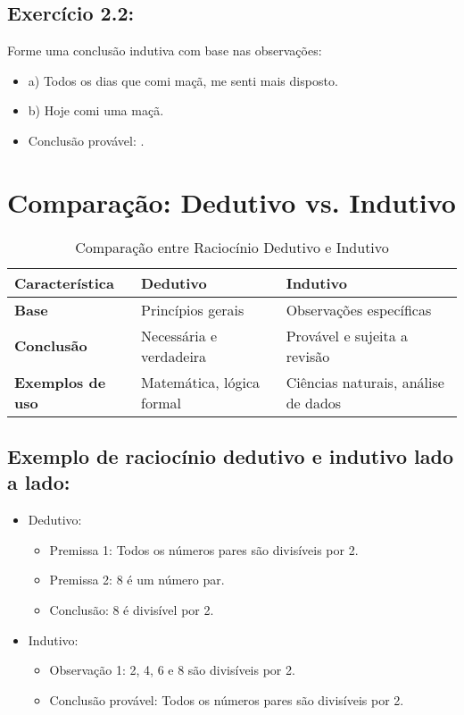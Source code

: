 \documentclass[a4paper,12pt]{book}
\begin{document}
\subsection*{Exercício 2.2:}

Forme uma conclusão indutiva com base nas observações:
\begin{itemize}
\item a) Todos os dias que comi maçã, me senti mais disposto.
\item b) Hoje comi uma maçã.
\item Conclusão provável: \underline{\hspace{5cm}}.
\end{itemize}

\newpage

\section{Comparação: Dedutivo vs. Indutivo}

\begin{table}[h!]
\centering
\begin{tabular}{|l|l|l|}
\hline
\textbf{Característica}       & \textbf{Dedutivo}              & \textbf{Indutivo}                \\ \hline
\textbf{Base}                 & Princípios gerais             & Observações específicas          \\ \hline
\textbf{Conclusão}            & Necessária e verdadeira       & Provável e sujeita a revisão     \\ \hline
\textbf{Exemplos de uso}      & Matemática, lógica formal     & Ciências naturais, análise de dados \\ \hline
\end{tabular}
\caption{Comparação entre Raciocínio Dedutivo e Indutivo}
\label{tab:dedutivo_indutivo}
\end{table}


\subsection*{Exemplo de raciocínio dedutivo e indutivo lado a lado:}

\begin{itemize}
\item Dedutivo:\begin{itemize}
\item Premissa 1: Todos os números pares são divisíveis por 2.
\item Premissa 2: 8 é um número par.
\item Conclusão: 8 é divisível por 2.
\end{itemize}
\item Indutivo:\begin{itemize}
\item Observação 1: 2, 4, 6 e 8 são divisíveis por 2.
\item Conclusão provável: Todos os números pares são divisíveis por 2.
\end{itemize}
\end{itemize}
\end{document}
